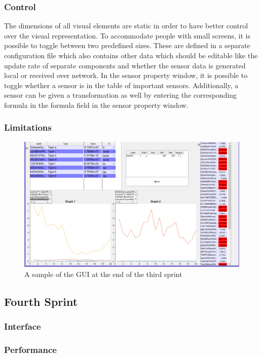 \subsubsection{Control}
The dimensions of all visual elements are static in order to have better control over the visual representation. To accommodate people with small screens, %
it is possible to toggle between two predefined sizes. These are defined in a separate configuration file which also contains other data which should be editable like the update rate of separate components and whether the sensor data is generated local or received over network. In the sensor property window, it is possible to toggle whether a sensor is in the table of important sensors. Additionally, a sensor can be given a transformation as well by entering the corresponding formula in the formula field in the sensor property window. 


\subsubsection{Limitations}

\begin{figure}[H]
	\centering
	\includegraphics[width=.75\textwidth]{images/GUIV2}
	\caption{A sample of the GUI at the end of the third sprint} 
	\label{fig:GUIV2}
\end{figure} 

\subsection{Fourth Sprint}

\subsubsection{Interface}

\subsubsection{Performance}


